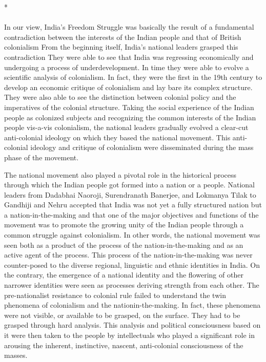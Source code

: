 \begin{multicols}{2}
\begin{center}*\end{center}

\paragraph*{}
In our view, India's Freedom Struggle was basically the result of a fundamental contradiction between the interests of the Indian people and that of British colonialism From the beginning itself, India's national leaders grasped this contradiction They were able to see that India was regressing economically and undergoing a process of underdevelopment. In time they were able to evolve a scientific analysis of colonialism. In fact, they were the first in the 19th century to develop an economic critique of colonialism and lay bare its complex structure. They were also able to see the distinction between colonial policy and the imperatives of the colonial structure. Taking the social experience of the Indian people as colonized subjects and recognizing the common interests of the Indian people vis-a-vis colonialism, the national leaders gradually evolved a clear-cut anti-colonial ideology on which they based the national movement. This anti-colonial ideology and critique of colonialism were disseminated during the mass phase of the movement.

The national movement also played a pivotal role in the historical process through which the Indian people got formed into a nation or a people. National leaders from Dadabhai Naoroji, Surendranath Banerjee, and Lokmanya Tilak to Gandhiji and Nehru accepted that India was not yet a fully structured nation but a nation-in-the-making and that one of the major objectives and functions of the movement was to promote the growing unity of the Indian people through a common struggle against colonialism. In other words, the national movement was seen both as a product of the process of the nation-in-the-making and as an active agent of the process. This process of the nation-in-the-making was never counter-posed to the diverse regional, linguistic and ethnic identities in India. On the contrary, the emergence of a national identity and the flowering of other narrower identities were seen as processes deriving strength from each other. The pre-nationalist resistance to colonial rule failed to understand the twin phenomena of colonialism and the nation­in-the-making. In fact, these phenomena were not visible, or available to be grasped, on the surface. They had to be grasped through hard analysis. This analysis and political consciousness based on it were then taken to the people by intellectuals who played a significant role in arousing the inherent, instinctive, nascent, anti-colonial consciousness of the masses.


\end{multicols}
